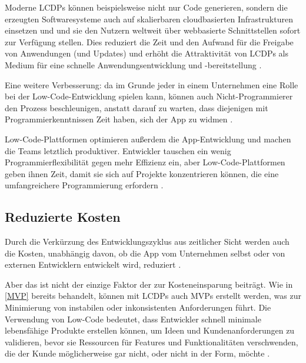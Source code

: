 \documentclass[12pt]{article} %
\begin{document}
	Moderne LCDPs können beispielsweise nicht nur Code generieren, sondern die erzeugten Softwaresysteme auch auf skalierbaren cloudbasierten Infrastrukturen einsetzen und und sie den Nutzern weltweit über webbasierte Schnittstellen sofort zur Verfügung stellen. Dies reduziert die Zeit und den Aufwand für die Freigabe von Anwendungen (und Updates) und erhöht die Attraktivität von LCDPs als Medium für eine schnelle Anwendungsentwicklung und -bereitstellung \cite{DiRuscio.2022}.
	
	Eine weitere Verbesserung: da im Grunde jeder in einem Unternehmen eine Rolle bei der Low-Code-Entwicklung spielen kann, können auch Nicht-Programmierer den Prozess beschleunigen, anstatt darauf zu warten, dass diejenigen mit Programmierkenntnissen Zeit haben, sich der App zu widmen \cite{Microsoft.2023}.
	
	Low-Code-Plattformen optimieren außerdem die App-Entwicklung und machen die Teams letztlich produktiver. Entwickler tauschen ein wenig Programmierflexibilität gegen mehr Effizienz ein, aber Low-Code-Plattformen geben ihnen Zeit, damit sie sich auf Projekte konzentrieren können, die eine umfangreichere Programmierung erfordern \cite{Microsoft.2023}.
	
	\subsection{Reduzierte Kosten}	
	Durch die Verkürzung des Entwicklungszyklus aus zeitlicher Sicht werden auch die Kosten, unabhängig davon, ob die App vom Unternehmen selbst oder von externen Entwicklern entwickelt wird, reduziert \cite{Sanchis.2020b}. \newline
	
	Aber das ist nicht der einzige Faktor der zur Kosteneinsparung beiträgt. Wie in \ref{MVP} bereits behandelt, können mit LCDPs auch MVPs erstellt werden, was zur Minimierung von instabilen oder inkonsistenten Anforderungen führt. Die Verwendung von Low-Code bedeutet, dass Entwickler schnell minimale lebensfähige Produkte erstellen können, um Ideen und Kundenanforderungen zu validieren, bevor sie Ressourcen für Features und Funktionalitäten verschwenden, die der Kunde möglicherweise gar nicht, oder nicht in der Form, möchte \cite{Sanchis.2020b}.
	
	
\end{document}
